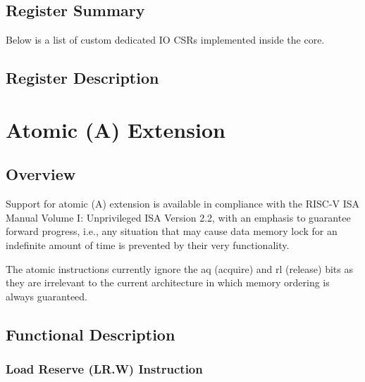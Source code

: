 \documentclass[main\_\_EN.tex]{subfiles}
\begin{document}
\subsection{Register Summary}
\label{sec:riscvcpu-fastio-reg-summ}


Below is a list of custom dedicated IO CSRs implemented inside the core.




\subsection{Register Description}
\label{sec:riscvcpu-fastio-reg-desc}



\clearpage
\section{Atomic (A) Extension}
\label{sec:riscvcpu-atomic}

\subsection{Overview}
\label{sec:riscvcpu-atomic-overview}

Support for atomic (A) extension is available in compliance with the RISC-V ISA Manual Volume I: Unprivileged ISA Version 2.2, with an emphasis to guarantee forward progress, i.e., any situation that may cause data memory lock for an indefinite amount of time is prevented by their very functionality.

The atomic instructions currently ignore the aq (acquire) and rl (release) bits as they are irrelevant to the current architecture in which memory ordering is always guaranteed.

\subsection{Functional Description}
\label{sec:riscvcpu-atomic-func-descr}

\subsubsection{Load Reserve (LR.W) Instruction}
\label{sec:riscvcpu-atomic-lr}
\end{document}
